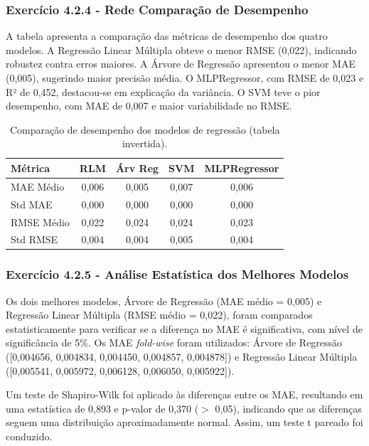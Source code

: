 \documentclass[conference]{IEEEtran}
\begin{document}
\medskip
\subsubsection{\textbf{Exercício 4.2.4 - Rede Comparação de Desempenho}}

A tabela apresenta a comparação das métricas de desempenho dos quatro modelos. A Regressão Linear Múltipla obteve o menor RMSE (0,022), indicando robustez contra erros maiores. A Árvore de Regressão apresentou o menor MAE (0,005), sugerindo maior precisão média. O MLPRegressor, com RMSE de 0,023 e R² de 0,452, destacou-se em explicação da variância. O SVM teve o pior desempenho, com MAE de 0,007 e maior variabilidade no RMSE.

\begin{table}[h]
	\centering
	\caption{Comparação de desempenho dos modelos de regressão (tabela invertida).}
	\label{tab:model_comparison_inverted}
	\begin{tabular}{lcccc}
		\toprule
		\textbf{Métrica} & \textbf{RLM} & \textbf{Árv Reg} & \textbf{SVM} & \textbf{MLPRegressor} \\
		\midrule
		MAE Médio        & 0,006 & 0,005 & 0,007 & 0,006 \\
		Std MAE          & 0,000 & 0,000 & 0,000 & 0,000 \\
		RMSE Médio       & 0,022 & 0,024 & 0,024 & 0,023 \\
		Std RMSE         & 0,004 & 0,004 & 0,005 & 0,004 \\
		\bottomrule
	\end{tabular}
\end{table}

\medskip
\subsubsection{\textbf{Exercício 4.2.5 - Análise Estatística dos Melhores Modelos}}

Os dois melhores modelos, Árvore de Regressão (MAE médio = 0,005) e Regressão Linear Múltipla (RMSE médio = 0,022), foram comparados estatisticamente para verificar se a diferença no MAE é significativa, com nível de significância de 5\%. Os MAE \textit{fold-wise} foram utilizados: Árvore de Regressão ([0,004656, 0,004834, 0,004450, 0,004857, 0,004878]) e Regressão Linear Múltipla ([0,005541, 0,005972, 0,006128, 0,006050, 0,005922]).

Um teste de Shapiro-Wilk foi aplicado às diferenças entre os MAE, resultando em uma estatística de 0,893 e p-valor de 0,370 ($>$ 0,05), indicando que as diferenças seguem uma distribuição aproximadamente normal. Assim, um teste t pareado foi conduzido.
\end{document}
